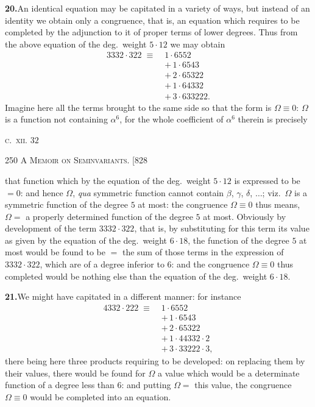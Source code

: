 \documentclass[11pt]{article}
\begin{document}
\medskip
\noindent\textbf{20.}\quad An identical equation may be capitated in a variety of
ways, but instead of an identity we obtain only a congruence, that is, an equation
which requires to be completed by the adjunction to it of proper terms of lower
degrees. Thus from the above equation of the deg.\ weight $5\cdot 12$ we may obtain
\[
\begin{aligned}
3332\cdot 322 \;\equiv\; & 1\cdot 6552 \\
                          & +\,1\cdot 6543 \\
                          & +\,2\cdot 65322 \\
                          & +\,1\cdot 64332 \\
                          & +\,3\cdot 633222.
\end{aligned}
\]
Imagine here all the terms brought to the same side so that the form is $\Omega\equiv 0$:
$\Omega$ is a function not containing $\alpha^{6}$, for the whole coefficient of $\alpha^{6}$
therein is precisely

\hfill {\scshape c.\ xii.} \hfill $32$

\newpage
\noindent\textsc{250 \hfill A Memoir on Seminvariants. \hfill [828}
\vspace{0.6em}

\noindent that function which by the equation of the deg.\ weight $5\cdot 12$ is
expressed to be $=0$: and hence $\Omega$, \textit{qua} symmetric function cannot
contain $\beta$, $\gamma$, $\delta$, $\ldots$; viz.\ $\Omega$ is a symmetric function
of the degree $5$ at most: the congruence $\Omega\equiv 0$ thus means, $\Omega=$ a
properly determined function of the degree $5$ at most. Obviously by development of
the term $3332\cdot 322$, that is, by substituting for this term its value as given
by the equation of the deg.\ weight $6\cdot 18$, the function of the degree $5$ at
most would be found to be $=$ the sum of those terms in the expression of
$3332\cdot 322$, which are of a degree inferior to $6$: and the congruence
$\Omega\equiv 0$ thus completed would be nothing else than the equation of the deg.\
weight $6\cdot 18$.

\medskip
\noindent\textbf{21.}\quad We might have capitated in a different manner: for instance
\[
\begin{aligned}
4332\cdot 222 \;\equiv\; & 1\cdot 6552 \\
                          & +\,1\cdot 6543 \\
                          & +\,2\cdot 65322 \\
                          & +\,1\cdot 44332\cdot 2 \\
                          & +\,3\cdot 33222\cdot 3,
\end{aligned}
\]
there being here three products requiring to be developed: on replacing them by their
values, there would be found for $\Omega$ a value which would be a determinate
function of a degree less than $6$: and putting $\Omega=$ this value, the congruence
$\Omega\equiv 0$ would be completed into an equation.
\end{document}

